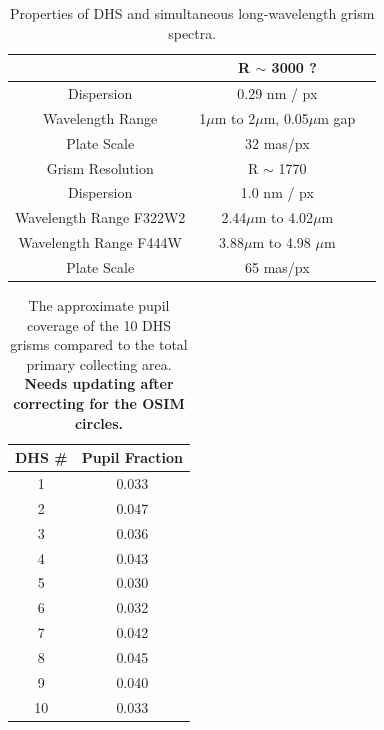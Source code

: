 \documentclass{emulateapj}
\newcommand{\DHSres}{3000 ?}
\begin{document}
\begin{table}
\centering
\begin{tabular}{ccc}
 &  R $\sim$ \DHSres \\
 \hline \hline
Dispersion & 0.29 nm / px \\
Wavelength Range & 1$\mu$m to 2$\mu$m, 0.05$\mu$m gap \\
Plate Scale & 32 mas/px \\
\hline \hline
Grism Resolution & R $\sim$ 1770 \\
Dispersion & 1.0 nm / px  \\
Wavelength Range F322W2 & 2.44$\mu$m to 4.02$\mu$m \\
Wavelength Range F444W & 3.88$\mu$m to 4.98 $\mu$m \\
Plate Scale & 65 mas/px \\
\end{tabular}
\caption{Properties of DHS and simultaneous long-wavelength grism spectra.}\label{tab:DHSgprop}
\end{table}


\begin{table}
\centering
\begin{tabular}{cc}
DHS \# & Pupil Fraction \\
\hline \hline
1 & 0.033 \\
2 & 0.047 \\
3 & 0.036 \\
4 & 0.043 \\
5 & 0.030 \\
6 & 0.032 \\
7 & 0.042 \\
8 & 0.045 \\
9 & 0.040 \\
10 & 0.033 \\
\end{tabular}
\caption{The approximate pupil coverage of the 10 DHS grisms compared to the total primary collecting area. \textbf{Needs updating after correcting for the OSIM circles.}}\label{tab:pupfrac}
\end{table}
\end{document}

